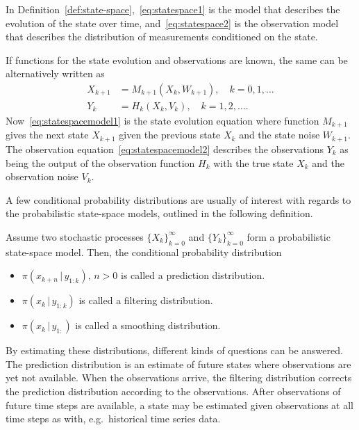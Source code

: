 In Definition~\ref{def:state-space},~\eqref{eq:statespace1} is the model that describes the evolution of the state over time, and~\eqref{eq:statespace2} is the observation model that describes the distribution of measurements conditioned on the state.

If functions for the state evolution and observations are known, the same can be alternatively written as 
\begin{subequations}\label{eq:statespacemodel}
    \begin{align}
        X_{k+1} &= M_{k+1}(X_{k}, W_{k+1}), \quad k = 0,1,\dots \label{eq:statespacemodel1}\\
        Y_{k} &= H_{k}(X_{k}, V_{k}), \quad k = 1,2,\dots. \label{eq:statespacemodel2}
    \end{align}
\end{subequations}
Now~\eqref{eq:statespacemodel1} is the state evolution equation where function $M_{k+1}$ gives the next state $X_{k+1}$ given the previous state $X_{k}$ and the state noise $W_{k+1}$.
The observation equation~\eqref{eq:statespacemodel2} describes the observations $Y_{k}$ as being the output of the observation function $H_{k}$ with the true state $X_{k}$ and the observation noise $V_{k}$.

A few conditional probability distributions are usually of interest with regards to the probabilistic state-space models, outlined in the following definition.
\begin{definition}
    Assume two stochastic processes $\{X_k\}_{k=0}^{\infty}$ and $\{Y_k\}_{k=0}^{\infty}$ form a probabilistic state-space model.
    Then, the conditional probability distribution
    \begin{itemize}
        \item
            $\pi(x_{k+n}\, \vert \, y_{1:k}), \, n > 0$ is called a prediction distribution.
        \item
            $\pi(x_k \, \vert \, y_{1:k})$ is called a filtering distribution.
        \item
            $\pi(x_k \, \vert \, y_{1:})$ is called a smoothing distribution.
    \end{itemize}
\end{definition}
By estimating these distributions, different kinds of questions can be answered.
The prediction distribution is an estimate of future states where observations are yet not available.
When the observations arrive, the filtering distribution corrects the prediction distribution according to the observations.
After observations of future time steps are available, a state may be estimated given observations at all time steps as with, e.g.\ historical time series data.

